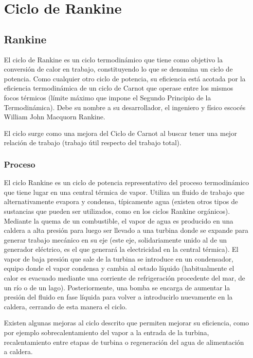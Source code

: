 \documentclass[../main]{subfiles}
\begin{document}
\chapter{Ciclo de Rankine}


\section{Rankine}


El ciclo de Rankine es un ciclo termodinámico que tiene como objetivo la conversión de calor en trabajo, constituyendo lo que se denomina un ciclo de potencia. Como cualquier otro ciclo de potencia, su eficiencia está acotada por la eficiencia termodinámica de un ciclo de Carnot que operase entre los mismos focos térmicos (límite máximo que impone el Segundo Principio de la Termodinámica). Debe su nombre a su desarrollador, el ingeniero y físico escocés William John Macquorn Rankine.

El ciclo surge como una mejora del Ciclo de Carnot al buscar tener una mejor relación de trabajo (trabajo útil respecto del trabajo total).

\subsection{Proceso}
El ciclo Rankine es un ciclo de potencia representativo del proceso termodinámico que tiene lugar en una central térmica de vapor. Utiliza un fluido de trabajo que alternativamente evapora y condensa, típicamente agua (existen otros tipos de sustancias que pueden ser utilizados, como en los ciclos Rankine orgánicos). Mediante la quema de un combustible, el vapor de agua es producido en una caldera a alta presión para luego ser llevado a una turbina donde se expande para generar trabajo mecánico en su eje (este eje, solidariamente unido al de un generador eléctrico, es el que generará la electricidad en la central térmica). El vapor de baja presión que sale de la turbina se introduce en un condensador, equipo donde el vapor condensa y cambia al estado líquido (habitualmente el calor es evacuado mediante una corriente de refrigeración procedente del mar, de un río o de un lago). Posteriormente, una bomba se encarga de aumentar la presión del fluido en fase líquida para volver a introducirlo nuevamente en la caldera, cerrando de esta manera el ciclo.

Existen algunas mejoras al ciclo descrito que permiten mejorar su eficiencia, como por ejemplo sobrecalentamiento del vapor a la entrada de la turbina, recalentamiento entre etapas de turbina o regeneración del agua de alimentación a caldera.
\end{document}
